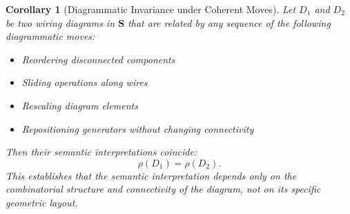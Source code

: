 \documentclass[11pt]{article}
\newtheorem{corollary}{Corollary}
\begin{document}
\begin{corollary}[Diagrammatic Invariance under Coherent Moves]\label{cor:diagrammatic-invariance}
Let $D_1$ and $D_2$ be two wiring diagrams in $\mathbf{S}$ that are related by any sequence of the following diagrammatic moves:
\begin{itemize}
    \item Reordering disconnected components
    \item Sliding operations along wires
    \item Rescaling diagram elements
    \item Repositioning generators without changing connectivity
\end{itemize}
Then their semantic interpretations coincide:
\[
\rho(D_1) = \rho(D_2).
\]
This establishes that the semantic interpretation depends only on the combinatorial structure and connectivity of the diagram, not on its specific geometric layout.
\end{corollary}
\end{document}
